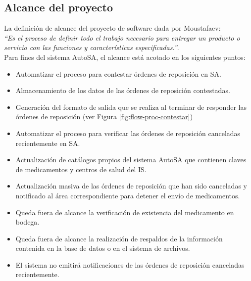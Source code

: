 \subsection{Alcance del proyecto}\label{sec-alcance}
La definición de alcance del proyecto de software dada por Moustafaev:\\
\textit{``Es el proceso de definir todo el trabajo necesario para entregar un producto o servicio con las funciones y características especificadas.''}\cite{ScopeManagement}.\\
Para fines del sistema AutoSA, el alcance está acotado en los siguientes puntos:
\begin{itemize}
\item Automatizar el proceso para contestar órdenes de reposición en SA.
\item Almacenamiento de los datos de las órdenes de reposición contestadas.
\item Generación del formato de salida que se realiza al terminar de responder las órdenes de reposición (ver Figura \ref{fig:flow-proc-contestar})
\item Automatizar el proceso para verificar las órdenes de reposición canceladas recientemente en SA.
\item Actualización de catálogos propios del sistema AutoSA que contienen claves de medicamentos y centros de salud del IS.
\item Actualización masiva de las órdenes de reposición que han sido canceladas y notificado al área correspondiente para detener el envío de medicamentos.
\item Queda fuera de alcance la verificación de existencia del medicamento en bodega.
\item Queda fuera de alcance la realización de respaldos de la información contenida en la base de datos o en el sistema de archivos.
\item El sistema no emitirá notificaciones de las órdenes de reposición canceladas recientemente.
\end{itemize}



